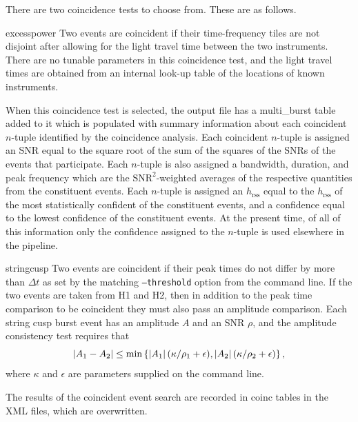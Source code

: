\documentclass[10pt]{article}
\newcommand{\option}[1]{\texttt{#1}}
\newenvironment{entry}%
{\begin{list}{}{\renewcommand{\makelabel}[1]%
{\parbox[b]{\labelwidth}{\makebox[0pt][l]{\textbf{##1}}\\}}%
\setlength{\labelwidth}{1em}%
\setlength{\labelsep}{1em}%
\setlength{\leftmargin}{2em}%
\setlength{\topsep}{\medskipamount}%
\setlength{\itemsep}{\medskipamount}%
\setlength{\parsep}{\medskipamount}%
\setlength{\listparindent}{0pt}}}
{\end{list}}
\begin{document}
There are two coincidence tests to choose from.  These are as follows.
\begin{entry}
\item[excesspower]
Two events are coincident if their time-frequency tiles are not disjoint
after allowing for the light travel time between the two instruments.
There are no tunable parameters in this coincidence test, and the light
travel times are obtained from an internal look-up table of the locations
of known instruments.

When this coincidence test is selected, the output file has a multi\_burst
table added to it which is populated with summary information about each
coincident \(n\)-tuple identified by the coincidence analysis.  Each
coincident \(n\)-tuple is assigned an SNR equal to the square root of the
sum of the squares of the SNRs of the events that participate.  Each
\(n\)-tuple is also assigned a bandwidth, duration, and peak frequency
which are the \(\text{SNR}^{2}\)-weighted averages of the respective
quantities from the constituent events.  Each \(n\)-tuple is assigned an
\(h_{\text{rss}}\) equal to the \(h_{\text{rss}}\) of the most
statistically confident of the constituent events, and a confidence equal
to the lowest confidence of the constituent events.  At the present time,
of all of this information only the confidence assigned to the \(n\)-tuple
is used elsewhere in the pipeline.

\item[stringcusp]
Two events are coincident if their peak times do not differ by more than
\(\Delta t\) as set by the matching \option{--threshold} option from the
command line.  If the two events are taken from H1 and H2, then in addition
to the peak time comparison to be coincident they must also pass an
amplitude comparison.  Each string cusp burst event has an amplitude \(A\)
and an SNR \(\rho\), and the amplitude consistency test requires that
\begin{equation}
\left|A_{1} - A_{2}\right|
   \leq \min \left\{ \left|A_{1}\right| (\kappa / \rho_{1} + \epsilon),
   \left|A_{2}\right| (\kappa / \rho_{2} + \epsilon) \right\},
\end{equation}
where \(\kappa\) and \(\epsilon\) are parameters supplied on the command
line.

\end{entry}

The results of the coincident event search are recorded in coinc tables in
the XML files, which are overwritten.
\end{document}
